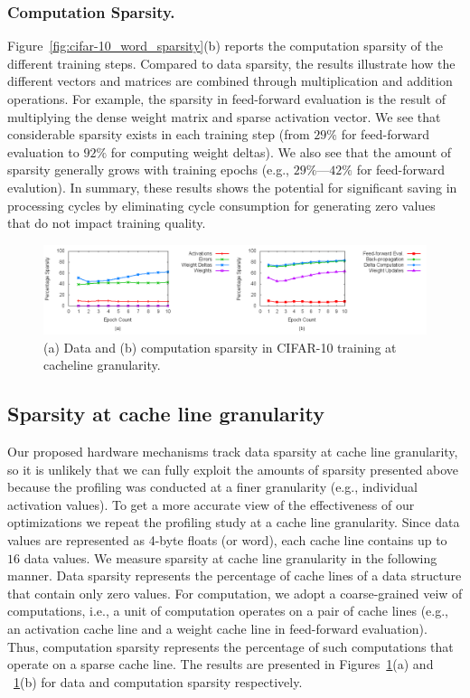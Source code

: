 \subsubsection{Computation Sparsity.}
 Figure~\ref{fig:cifar-10_word_sparsity}(b) reports the computation sparsity of the different training steps. Compared to data sparsity, the results illustrate how the different vectors and matrices are combined through multiplication and addition operations.  For example, the sparsity in feed-forward evaluation is the result of multiplying the dense weight matrix and sparse activation vector.  We see that considerable sparsity exists in each training step (from $29\%$ for feed-forward evaluation to $92\%$ for computing weight deltas).  We also see that the amount of sparsity generally grows with training epochs (e.g., $29\%$---$42\%$ for feed-forward evalution).  In summary, these results shows the potential for significant saving in processing cycles by eliminating cycle consumption for generating zero values that do not impact training quality.  

\begin{figure}
 \centering
 \includegraphics[width=1.9\columnwidth]{Figures/cifar-10_cacheline_sparsity.png}
\caption{(a) Data and (b) computation sparsity in CIFAR-10 training at cacheline granularity.}
 \label{fig:cifar-10_cacheline_sparsity}
 \end{figure}

\subsection{Sparsity at cache line granularity}
\label{subsec:sparse_opt_limit}

Our proposed hardware mechanisms track data sparsity at cache line granularity, so it is unlikely that we can fully exploit the amounts of sparsity presented above because the profiling was conducted at a finer granularity (e.g., individual activation values). To get a more accurate view of  the effectiveness of our optimizations we repeat the profiling study at a cache line granularity. Since data values are represented as 4-byte floats (or word), each cache line contains up to $16$ data values. We measure sparsity at cache line granularity in the following manner.  Data sparsity represents the percentage of cache lines of a data structure that contain only zero values.  For computation, we adopt a coarse-grained veiw of computations, i.e., a unit of computation operates on a pair of cache lines (e.g., an activation cache line and a weight cache line in feed-forward evaluation).  Thus,  computation sparsity represents the percentage of such computations that operate on a sparse cache line. The results are presented in Figures~\ref{fig:cifar-10_cacheline_sparsity}(a) and ~\ref{fig:cifar-10_cacheline_sparsity}(b) for data and computation sparsity respectively.  

